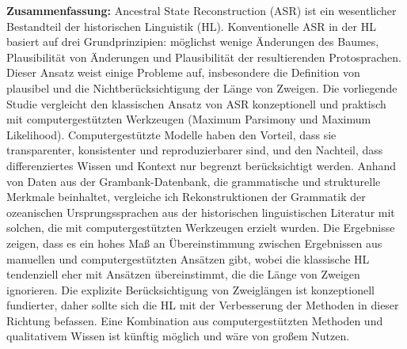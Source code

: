 \documentclass[12pt,letterpaper]{article}
\begin{document}



\textbf{Zusammenfassung:}
Ancestral State Reconstruction (ASR) ist ein wesentlicher Bestandteil der historischen Linguistik (HL). Konventionelle ASR in der HL basiert auf drei Grundprinzipien: möglichst wenige Änderungen des Baumes, Plausibilität von Änderungen und Plausibilität der resultierenden Protosprachen. Dieser Ansatz weist einige Probleme auf, insbesondere die Definition von plausibel und die Nichtberücksichtigung der Länge von Zweigen. Die vorliegende Studie vergleicht den klassischen Ansatz von ASR konzeptionell und praktisch mit computergestützten Werkzeugen (Maximum Parsimony und Maximum Likelihood). Computergestützte Modelle haben den Vorteil, dass sie transparenter, konsistenter und reproduzierbarer sind, und den Nachteil, dass differenziertes Wissen und Kontext nur begrenzt berücksichtigt werden. Anhand von Daten aus der Grambank-Datenbank, die grammatische und strukturelle Merkmale beinhaltet, vergleiche ich Rekonstruktionen der Grammatik der ozeanischen Ursprungssprachen aus der historischen linguistischen Literatur mit solchen, die mit computergestützten Werkzeugen erzielt wurden. Die Ergebnisse zeigen, dass es ein hohes Maß an Übereinstimmung zwischen Ergebnissen aus manuellen und computergestützten Ansätzen gibt, wobei die klassische HL tendenziell eher mit Ansätzen übereinstimmt, die die Länge von Zweigen ignorieren. Die explizite Berücksichtigung von Zweiglängen ist konzeptionell fundierter, daher sollte sich die HL mit der Verbesserung der Methoden in dieser Richtung befassen. Eine Kombination aus computergestützten Methoden und qualitativem Wissen ist künftig möglich und wäre von großem Nutzen.
\end{document}
